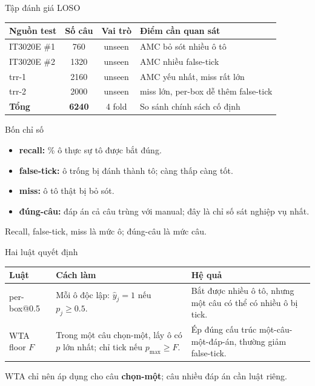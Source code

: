 \documentclass{beamer}
\newcommand{\hl}[1]{\textbf{#1}}
\begin{document}
\begin{frame}{Tập đánh giá LOSO}
\footnotesize
\begin{center}
\begin{tabular}{|l|c|c|l|}
\hline
\textbf{Nguồn test} & \textbf{Số câu} & \textbf{Vai trò} & \textbf{Điểm cần quan sát} \\
\hline
IT3020E \#1 & 760 & unseen & AMC bỏ sót nhiều ô tô \\
\hline
IT3020E \#2 & 1320 & unseen & AMC nhiều false-tick \\
\hline
trr-1 & 2160 & unseen & AMC yếu nhất, miss rất lớn \\
\hline
trr-2 & 2000 & unseen & miss lớn, per-box dễ thêm false-tick \\
\hline
\hl{Tổng} & \hl{6240} & 4 fold & So sánh chính sách cố định \\
\hline
\end{tabular}
\end{center}
\vspace{0.2cm}
\end{frame}

\begin{frame}{Bốn chỉ số}
\begin{itemize}
    \item \hl{recall:} \% ô thực sự tô được bắt đúng.
    \item \hl{false-tick:} ô trống bị đánh thành tô; càng thấp càng tốt.
    \item \hl{miss:} ô tô thật bị bỏ sót.
    \item \hl{đúng-câu:} đáp án cả câu trùng với manual; đây là chỉ số sát nghiệp vụ nhất.
\end{itemize}
\vspace{0.15cm}
{\footnotesize Recall, false-tick, miss là mức ô; đúng-câu là mức câu.}
\end{frame}

\begin{frame}{Hai luật quyết định}
\footnotesize
\begin{center}
\begin{tabular}{|l|p{4.2cm}|p{4.6cm}|}
\hline
\textbf{Luật} & \textbf{Cách làm} & \textbf{Hệ quả} \\
\hline
per-box@0.5 &
Mỗi ô độc lập: $\hat y_j=1$ nếu $p_j\ge0.5$. &
Bắt được nhiều ô tô, nhưng một câu có thể có nhiều ô bị tick. \\
\hline
WTA floor $F$ &
Trong một câu chọn-một, lấy ô có $p$ lớn nhất; chỉ tick nếu $p_{\max}\ge F$. &
Ép đúng cấu trúc một-câu-một-đáp-án, thường giảm false-tick. \\
\hline
\end{tabular}
\end{center}
\vspace{0.2cm}
{\scriptsize WTA chỉ nên áp dụng cho câu \hl{chọn-một}; câu nhiều đáp án cần luật riêng.}
\end{frame}
\end{document}
